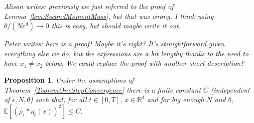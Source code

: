 \documentclass[12pt]{article}
\newtheorem{proposition}[theorem]{Proposition}
\newcommand{\IE}{\mathbb E}
\newcommand{\IR}{\mathbb R}
\newcommand{\comment}[1]{{\color{blue} \it #1}}
\begin{document}
\comment{Alison writes: previously we just referred to the proof of Lemma~\ref{lem:SecondMomentMass},
but that was wrong.
I think using $\theta/(N \varepsilon^d) \to 0$ this is easy, but should maybe write it out.}

\comment{Peter writes: here is a proof! Maybe it's right?
It's straightforward given everything else we do,
but the expressions are a bit lengthy thanks to the need to have $x_1 \neq x_2$ below.
We could replace the proof with another short description?}

\begin{proposition}
        \label{Prop:SecondMomentDensity}
    Under the assumptions of Theorem~\ref{TeoremOneStepConvergence}
    there is a finite constant $C$ (independent of $\epsilon, N, \theta$) such that,
    for all $t \in [0,T]$, $x \in \IR^d$ and for big enough $N$ and $\theta$,
    $\IE[ (\rho_\epsilon*\eta_t(x))^2] \leq C$.
\end{proposition} 
\end{document}
